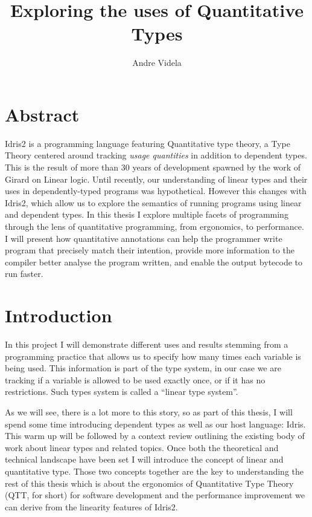 \documentclass[
]{article}
\author{}
\date{}
\begin{document}
\title{Exploring the uses of Quantitative Types}
\author{Andre Videla}
\maketitle

\hypertarget{abstract}{%
\section{Abstract}\label{abstract}}

Idris2 is a programming language featuring Quantitative type theory, a
Type Theory centered around tracking \emph{usage quantities} in addition
to dependent types. This is the result of more than 30 years of
development spawned by the work of Girard on Linear logic. Until
recently, our understanding of linear types and their uses in
dependently-typed programs was hypothetical. However this changes with
Idris2, which allow us to explore the semantics of running programs
using linear and dependent types. In this thesis I explore multiple
facets of programming through the lens of quantitative programming, from
ergonomics, to performance. I will present how quantitative annotations
can help the programmer write program that precisely match their
intention, provide more information to the compiler better analyse the
program written, and enable the output bytecode to run faster.

\newpage
\setcounter{secnumdepth}{2}
\tableofcontents
\newpage

\hypertarget{introduction}{%
\section{Introduction}\label{introduction}}

In this project I will demonstrate different uses and results stemming
from a programming practice that allows us to specify how many times
each variable is being used. This information is part of the type
system, in our case we are tracking if a variable is allowed to be used
exactly once, or if it has no restrictions. Such types system is called
a ``linear type system''.

As we will see, there is a lot more to this story, so as part of this
thesis, I will spend some time introducing dependent types as well as
our host language: Idris. This warm up will be followed by a context
review outlining the existing body of work about linear types and
related topics. Once both the theoretical and technical landscape have
been set I will introduce the concept of linear and quantitative type.
Those two concepts together are the key to understanding the rest of
this thesis which is about the ergonomics of Quantitative Type
Theory\cite{qtt}\cite{nuttin} (QTT, for short) for software development
and the performance improvement we can derive from the linearity
features of Idris2.
\end{document}
